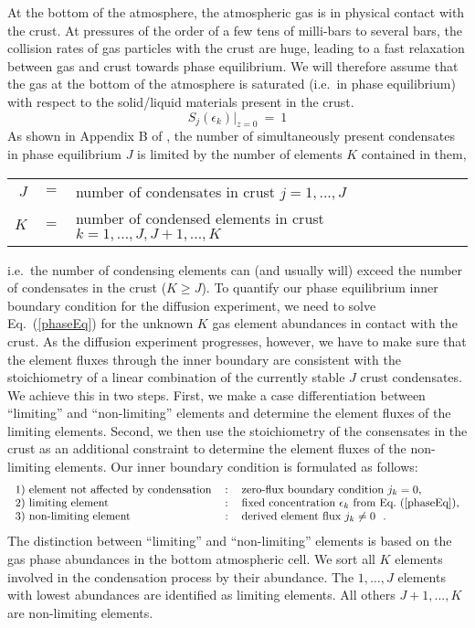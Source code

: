 \documentclass[11pt]{article}
\def\ek{\epsilon_k}
\begin{document}
At the bottom of the atmosphere, the atmospheric gas is in physical
contact with the crust. At pressures of the order of a few tens of
milli-bars to several bars, the collision rates of gas particles with
the crust are huge, leading to a fast relaxation between gas and crust
towards phase equilibrium.  We will therefore assume that the gas at
the bottom of the atmosphere is saturated (i.e.\ in phase equilibrium)
with respect to the solid/liquid materials present in the crust.
\begin{equation}
  S_j(\ek)\Big|_{z=0} ~=~ 1
  \label{phaseEq}
\end{equation}
As shown in Appendix B of \citep{Woitke2017}, the number of
simultaneously present condensates in phase equilibrium $J$ is limited
by the number of elements $K$ contained in them,
\smallskip
\begin{center}
\begin{tabular}{rcl}
  $J$ &$=$& number of condensates in crust $j=1,...,J$\\
  $K$ &$=$& number of condensed elements in crust $k=1,...,J,J+1,...,K$ \\
\end{tabular}
\end{center} 
i.e.\ the number of condensing elements can (and usually will) exceed
the number of condensates in the crust ($K\geq J$). To quantify our
phase equilibrium inner boundary condition for the diffusion
experiment, we need to solve Eq.~(\ref{phaseEq}) for the unknown $K$
gas element abundances in contact with the crust. As the diffusion
experiment progresses, however, we have to make sure that the element
fluxes through the inner boundary are consistent with the
stoichiometry of a linear combination of the currently stable $J$ crust
condensates. We achieve this in two steps. First, we make a case
differentiation between ``limiting'' and ``non-limiting'' elements and
determine the element fluxes of the limiting elements. Second, we then
use the stoichiometry of the consensates in the crust as an additional
constraint to determine the element fluxes of the non-limiting
elements. Our inner boundary condition is formulated as follows:
\begin{equation}
\mbox{\begin{tabular}{lcl}
  1) element not affected by condensation &:& zero-flux boundary
                                              condition $j_k=0$,\\
  2) limiting element &:& fixed concentration $\ek$ from
            Eq.~(\ref{phaseEq}),\\
  3) non-limiting element &:& derived element flux $j_k\neq0$  \ .
\end{tabular}}
\label{eq:innerBC}
\end{equation}
The distinction between ``limiting'' and ``non-limiting'' elements is
based on the gas phase abundances in the bottom atmospheric cell. We
sort all $K$ elements involved in the condensation process by their
abundance. The $1,...,J$ elements with lowest abundances are
identified as limiting elements. All others $J+1,...,K$ are
non-limiting elements.
\end{document}
